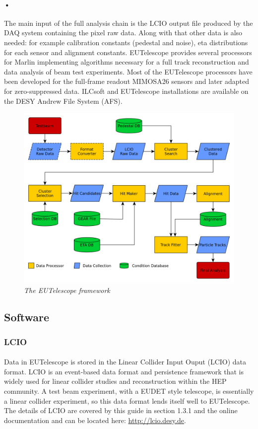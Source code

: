 \documentclass[11pt]{article}
\begin{document}
\paragraph{•}
The main input of the full analysis chain is the LCIO output file produced by the DAQ system containing the pixel raw data. Along with that other data is also needed: for example calibration constants (pedestal and noise), eta distributions for each sensor and alignment constants. EUTelescope provides several processors for Marlin implementing algorithms necessary for a full track reconstruction and data analysis of beam test experiments. Most of the EUTelescope processors have been developed for the full-frame readout MIMOSA26 sensors and later adapted for zero-suppressed data. ILCsoft and EUTelescope installations are available on the DESY Andrew File System (AFS).
\begin{figure}[!ht]
	\centering
	\includegraphics[scale=0.3]{images/eutel-strategy.png}
	\caption{\textit{The EUTelescope framework}}
\end{figure}
\subsection{Software}
\subsubsection{LCIO}
\paragraph{}
Data in EUTelescope is stored in the Linear Collider Input Ouput (LCIO) data format. LCIO is an event-based data format and persistence framework that is widely used for linear collider studies and reconstruction within the HEP community. A test beam experiment, with a EUDET style telescope, is essentially a linear collider experiment, so this data format lends itself well to EUTelescope. The details of LCIO are covered by this guide in section 1.3.1 and the online documentation and can be located here: \url{http://lcio.desy.de}.
\end{document}
